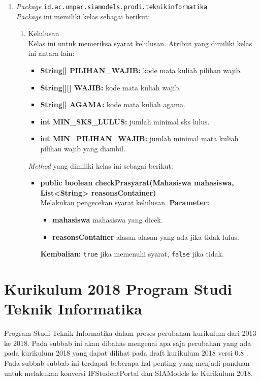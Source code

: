 \begin{enumerate}
\begin{table}[H]
	\label{tab:3_kelas_matakuliah}
\end{table}
	\item \textit{Package} \texttt{id.ac.unpar.siamodels.prodi.teknikinformatika}\\
	\textit{Package} ini memiliki kelas sebagai berikut:
	\begin{enumerate}
		\item Kelulusan\\
		Kelas ini untuk memeriksa syarat kelulusan. Atribut yang dimiliki kelas ini antara lain:
		\begin{itemize}
			\item \textbf{String[] PILIHAN\_WAJIB:} kode mata kuliah pilihan wajib.
			\item \textbf{String[][] WAJIB:} kode mata kuliah wajib.
			\item \textbf{String[] AGAMA:} kode mata kuliah agama.
			\item \textbf{int MIN\_SKS\_LULUS:} jumlah minimal sks lulus.
			\item \textbf{int MIN\_PILIHAN\_WAJIB:} jumlah minimal mata kuliah pilihan wajib yang diambil.
		\end{itemize}
		\textit{Method} yang dimiliki kelas ini sebagai berikut:
		\begin{itemize}
			\item \textbf{public boolean checkPrasyarat(Mahasiswa mahasiswa, List<String> reasonsContainer)}\\
			Melakukan pengecekan syarat kelulusan.
			\textbf{Parameter:}
			\begin{itemize}
				\item \textbf{mahasiswa} mahasiswa yang dicek.
				\item \textbf{reasonsContainer} alasan-alasan yang ada jika tidak lulus.
			\end{itemize}
			\textbf{Kembalian:} \texttt{true} jika memenuhi syarat, \texttt{false} jika tidak.
		\end{itemize}
	\end{enumerate}
\end{enumerate}

\section{Kurikulum 2018 Program Studi Teknik Informatika}
\label{sec:kurikulum2018}

Program Studi Teknik Informatika dalam proses perubahan kurikulum dari 2013 ke 2018. Pada subbab ini akan dibahas mengenai apa saja perubahan yang ada pada kurikulum 2018 yang dapat dilihat pada draft kurikulum 2018 versi 0.8 \cite{draftkurikulum2018}. Pada subbab-subbab ini terdapat beberapa hal penting yang menjadi panduan untuk melakukan konversi IFStudentPortal dan SIAModels ke Kurikulum 2018.

